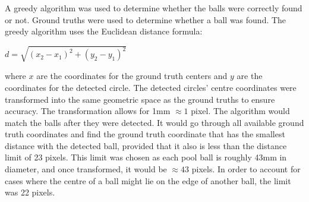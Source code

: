 \documentclass[12pt]{article}
\begin{document}
A greedy algorithm was used to determine whether the balls were correctly found or not. Ground truths were used to determine whether a ball was found. The greedy algorithm uses the Euclidean distance formula:
\begin{center}
    $d = \sqrt{(x_2 - x_1)^2 + (y_2 - y_1)^2}$
\end{center}
where $x$ are the coordinates for the ground truth centers and $y$ are the coordinates for the detected circle. The detected circles' centre coordinates were transformed into the same geometric space as the ground truths to ensure accuracy. The transformation allows for 1mm $\approx 1$ pixel. The algorithm would match the balls after they were detected. It would go through all available ground truth coordinates and find the ground truth coordinate that has the smallest distance with the detected ball, provided that it also is less than the distance limit of 23 pixels. This limit was chosen as each pool ball is roughly 43mm in diameter, and once transformed, it would be $\approx43$ pixels. In order to account for cases where the centre of a ball might lie on the edge of another ball, the limit was 22 pixels.
\end{document}
